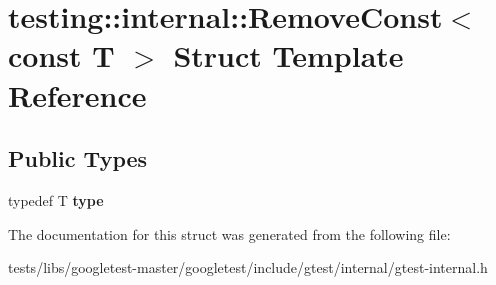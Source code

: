 \hypertarget{structtesting_1_1internal_1_1RemoveConst_3_01const_01T_01_4}{}\section{testing\+:\+:internal\+:\+:Remove\+Const$<$ const T $>$ Struct Template Reference}
\label{structtesting_1_1internal_1_1RemoveConst_3_01const_01T_01_4}
\subsection*{Public Types}
\begin{DoxyCompactItemize}
\item 
\mbox{\label{structtesting_1_1internal_1_1RemoveConst_3_01const_01T_01_4_ac88c6824d228ab05091e5a4f1c1a95fc}} 
typedef T {\bfseries type}
\end{DoxyCompactItemize}


The documentation for this struct was generated from the following file\+:\begin{DoxyCompactItemize}
\item 
tests/libs/googletest-\/master/googletest/include/gtest/internal/gtest-\/internal.\+h\end{DoxyCompactItemize}
